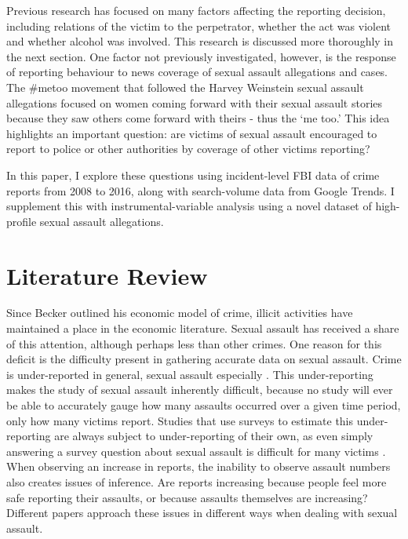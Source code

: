 \documentclass[AER,draftmode]{AEA}
\begin{document}
Previous research has focused on many factors affecting the reporting decision, including relations of the victim to the perpetrator, whether the act was violent and whether alcohol was involved. This research is discussed more thoroughly in the next section. One factor not previously investigated, however, is the response of reporting behaviour to news coverage of sexual assault allegations and cases. The \#metoo movement that followed the Harvey Weinstein sexual assault allegations  focused on women coming forward with their sexual assault stories because they saw others come forward with theirs - thus the `me too.' This idea highlights an important question: are victims of sexual assault encouraged to report to police or other authorities by coverage of other victims reporting?

In this paper, I explore these questions using incident-level FBI data of crime reports from 2008 to 2016, along with search-volume data from Google Trends. I supplement this  with instrumental-variable analysis using a novel dataset of high-profile sexual assault allegations. 

\section{Literature Review}

Since Becker outlined his economic model of crime, illicit activities have maintained a place in the economic literature. Sexual assault has received a share of this attention, although perhaps less than other crimes. One reason for this deficit is the difficulty present in gathering accurate data on sexual assault. Crime is under-reported in general, sexual assault especially \cite{fisher_sexual_2000}. This under-reporting makes the study of sexual assault inherently difficult, because no study will ever be able to accurately gauge how many assaults occurred over a given time period, only how many victims report. Studies that use surveys to estimate this under-reporting are always subject to under-reporting of their own, as even simply answering a survey question about sexual assault is difficult for many victims \cite{du_mont_role_2003}. When observing an increase in reports, the inability to observe assault numbers also creates issues of inference. Are reports increasing because people feel more safe reporting their assaults, or because assaults themselves are increasing? Different papers approach these issues in different ways when dealing with sexual assault.
\end{document}
